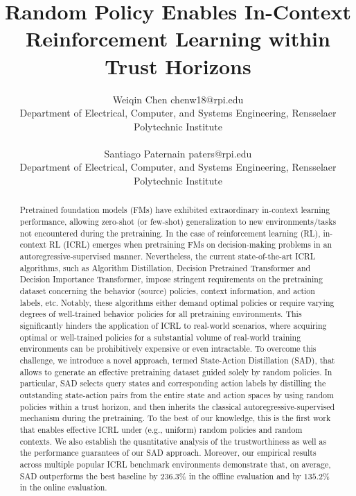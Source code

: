 \documentclass[10pt]{article} %
\title{Random Policy Enables In-Context Reinforcement Learning within Trust Horizons}
\author{\name Weiqin Chen \email chenw18@rpi.edu \\
      \addr Department of Electrical, Computer, and Systems Engineering, Rensselaer Polytechnic Institute \\
      \AND
      \\
      \name Santiago Paternain \email paters@rpi.edu \\
      \addr Department of Electrical, Computer, and Systems Engineering, Rensselaer Polytechnic Institute
      }
\begin{document}
\maketitle

\begin{abstract}

Pretrained foundation models (FMs) have exhibited extraordinary in-context learning performance, allowing zero-shot (or few-shot) generalization to new environments/tasks not encountered during the pretraining. In the case of reinforcement learning (RL), in-context RL (ICRL) emerges when pretraining FMs on decision-making problems in an autoregressive-supervised manner. Nevertheless, the current state-of-the-art ICRL algorithms, such as Algorithm Distillation,  Decision Pretrained Transformer and Decision Importance Transformer, impose stringent requirements on the pretraining dataset concerning the behavior (source) policies, context information, and action labels, etc. Notably, these algorithms either demand optimal policies or require varying degrees of well-trained behavior policies for all pretraining environments. This significantly hinders the application of ICRL to real-world scenarios, where acquiring optimal or well-trained policies for a substantial volume of real-world training environments can be prohibitively expensive or even intractable. To overcome this challenge, we introduce a novel approach, termed State-Action Distillation (SAD), that allows to generate an effective pretraining dataset guided solely by random policies. In particular, SAD selects query states and corresponding action labels by distilling the outstanding state-action pairs from the entire state and action spaces by using random policies within a trust horizon, and then inherits the classical autoregressive-supervised mechanism during the pretraining. To the best of our knowledge, this is the first work that enables effective ICRL under (e.g., uniform) random policies and random contexts. We also establish the quantitative analysis of the trustworthiness as well as the performance guarantees of our SAD approach. Moreover, our empirical results across multiple popular ICRL benchmark environments demonstrate that, on average, SAD outperforms the best baseline by $236.3\%$ in the offline evaluation and by $135.2\%$ in the online evaluation.

\end{abstract}













\clearpage




\clearpage
\appendix

\end{document}
